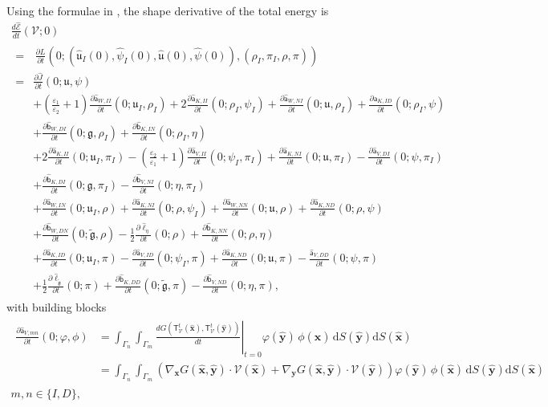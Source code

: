 \documentclass{article}
\theoremstyle{remark}
\newcommand{\T}{\mathsf{T}}
\newcommand{\aaa}{\mathsf{a}}
\newcommand{\bbb}{\mathsf{b}}
\newcommand{\hata}{\widehat{\aaa}}
\newcommand{\hatb}{\widehat{\bbb}}
\newcommand{\hatell}{\widehat{\ell}}
\newcommand{\dd}{\mathrm{d}}
\newcommand{\hatx}{\widehat{\boldsymbol{x}}}
\newcommand{\haty}{\widehat{\boldsymbol{y}}}
\newcommand{\argu}{\mathfrak{u}}
\newcommand{\argg}{\mathfrak{g}}
\newcommand{\tildeg}{\widetilde{\argg}}
\newcommand{\hatu}{\widehat{\argu}}
\newcommand{\hatpsi}{\widehat{\psi}}
\newcommand{\Eps}{\mathcal{E}}
\newcommand{\hatEps}{\widehat{\Eps}}
\newcommand{\hatJ}{\widehat{J}}
\newcommand{\Nu}{\mathcal{V}}
\newcommand{\Tt}{\T_\Nu^t}
\begin{document}
Using the formulae in \cite[Section~4.2]{main}, the shape derivative of the total energy is
\begin{multline}
\label{eq:pullback}
\frac{d\hatEps}{dt}(\Nu;0)\\
\begin{aligned}
    =&\,\frac{\partial L}{\partial t}(0;(\hatu_I(0),\hatpsi_I(0),\hatu(0),\hatpsi(0)),(\rho_I,\pi_I,\rho,\pi))\\
    =&\frac{\partial\hatJ}{\partial t}(0;\argu,\psi)\\
    &+\left(\frac{\varepsilon_1}{\varepsilon_2}+1\right)\frac{\partial\hata_{W,II}}{\partial t}(0;\argu_I,\rho_I)+2\frac{\partial\hata_{K,II}}{\partial t}(0;\rho_I,\psi_I)+\frac{\partial\hata_{W,NI}}{\partial t}(0;\argu,\rho_I)+\frac{\partial\hata_{K,ID}}{\partial t}(0;\rho_I,\psi)\\
    &+\frac{\partial\hatb_{W,DI}}{\partial t}(0;\argg,\rho_I)+\frac{\partial\hatb_{K,IN}}{\partial t}(0;\rho_I,\eta)\\
    &+2\frac{\partial\hata_{K,II}}{\partial t}(0;\argu_I,\pi_I)-\left(\frac{\varepsilon_2}{\varepsilon_1}+1\right)\frac{\partial\hata_{V,II}}{\partial t}(0;\psi_I,\pi_I)+\frac{\partial\hata_{K,NI}}{\partial t}(0;\argu,\pi_I)-\frac{\partial\hata_{V,DI}}{\partial t}(0;\psi,\pi_I)\\
    &+\frac{\partial\hatb_{K,DI}}{\partial t}(0;\argg,\pi_I)-\frac{\partial\hatb_{V,NI}}{\partial t}(0;\eta,\pi_I)\\
    &+\frac{\partial\hata_{W,IN}}{\partial t}(0;\argu_I,\rho)+\frac{\partial\hata_{K,NI}}{\partial t}(0;\rho,\psi_I)+\frac{\partial\hata_{W,NN}}{\partial t}(0;\argu,\rho)+\frac{\partial\hata_{K,ND}}{\partial t}(0;\rho,\psi)\\
    &+\frac{\partial\hatb_{W,DN}}{\partial t}(0;\tildeg,\rho)-\frac{1}{2}\frac{\partial\hatell_{\eta}}{\partial t}(0;\rho)+\frac{\partial\hatb_{K,NN}}{\partial t}(0;\rho,\eta)\\
    &+\frac{\partial\hata_{K,ID}}{\partial t}(0;\argu_I,\pi)-\frac{\partial\hata_{V,ID}}{\partial t}(0;\psi_I,\pi)+\frac{\partial\hata_{K,ND}}{\partial t}(0;\argu,\pi)-\frac{\hata_{V,DD}}{\partial t}(0;\psi,\pi)\\
    &+\frac{1}{2}\frac{\partial\hatell_{\tildeg}}{\partial t}(0;\pi)+\frac{\partial\hatb_{K,DD}}{\partial t}(0;\tildeg,\pi)-\frac{\partial\hatb_{V,ND}}{\partial t}(0;\eta,\pi),
\end{aligned}
\end{multline}
with building blocks
\begin{multline*}
    \begin{aligned}
    \frac{\partial\hata_{V,mn}}{\partial t}(0;\varphi,\phi)
    &=\int_{\Gamma_n}\int_{\Gamma_m}\left.\frac{dG(\Tt(\hatx),\Tt(\haty))}{dt}\right|_{t=0}\varphi(\haty)\,\phi(\hatx)\,\dd S(\haty)\dd S(\hatx)\\
    &=\int_{\Gamma_n}\int_{\Gamma_m}\left(\nabla_{\boldsymbol x}G(\hatx,\haty)\cdot\Nu(\hatx)+\nabla_{\boldsymbol y}G(\hatx,\haty)\cdot\Nu(\haty)\right)\varphi(\haty)\,\phi(\hatx)\,\dd S(\haty)\dd S(\hatx)
    \end{aligned}\\
    m,n\in\{I,D\},
\end{multline*}
\end{document}
